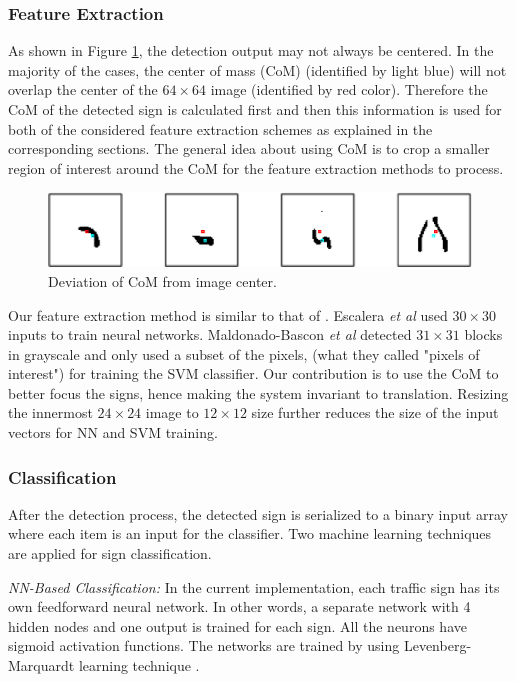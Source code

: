 \documentclass[review,number]{elsarticle}
\begin{document}
\subsubsection{Feature Extraction}
As shown in Figure \ref{signfig27}, the detection output may not always be centered. In the majority of the cases, the center of mass (CoM) (identified by light blue) will not overlap the center of the $64 \times 64$ image (identified by red color). Therefore the CoM of the detected sign is calculated first and then this information is used for both of the considered feature extraction schemes as explained in the corresponding sections. The general idea about using CoM is to crop a smaller region of interest around the CoM for the feature extraction methods to process.
\begin{figure}[ht]
\begin{center}
\includegraphics[scale=0.6]{img/signfig27.eps}
\caption{Deviation of CoM from image center.}
\label{signfig27}
\end{center}
\end{figure}
Our feature extraction method is similar to that of \cite{signbib02,Maldonadobascon07}. Escalera \textit{et al} \cite{signbib02} used $30 \times 30$ inputs to train neural networks. Maldonado-Bascon \textit{et al} \cite{Maldonadobascon07} detected $31 \times 31$ blocks in grayscale and only used a subset of the pixels, (what they called "pixels of interest") for training the SVM classifier. Our contribution is to use the CoM to better focus the signs, hence making the system invariant to translation. Resizing the innermost $24 \times 24$ image to $12 \times 12$ size further reduces the size of the input vectors for NN and SVM training.

\subsubsection{Classification}
After the detection process, the detected sign is serialized to a binary input array where each item is an input for the classifier. Two machine learning techniques are applied for sign classification.

\textit{NN-Based Classification:} In the current implementation, each traffic sign has its own feedforward neural network. In other words, a separate network with 4 hidden nodes and one output is trained for each sign. All the neurons have sigmoid activation functions. The networks are trained by using Levenberg-Marquardt learning technique \cite{wilamowski1999efficient}.
\end{document}
